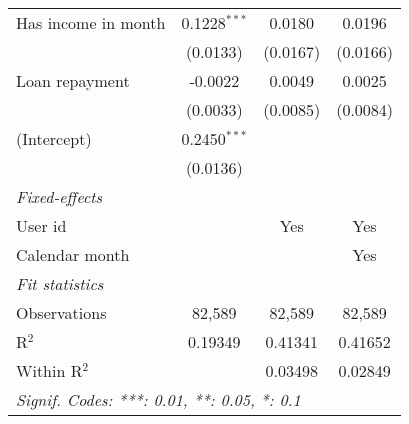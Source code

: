 \begin{table}[htbp]
\begin{footnotesize}
\begin{tabular}{lccc}
         Has income in month         & 0.1228$^{***}$  & 0.0180          & 0.0196\\
                                     & (0.0133)        & (0.0167)        & (0.0166)\\
         Loan repayment              & -0.0022         & 0.0049          & 0.0025\\
                                     & (0.0033)        & (0.0085)        & (0.0084)\\
         (Intercept)                 & 0.2450$^{***}$  &                 &   \\
                                     & (0.0136)        &                 &   \\
         \midrule \emph{Fixed-effects} &   &   &  \\
         User id                     &                 & Yes             & Yes\\
         Calendar month              &                 &                 & Yes\\
         \midrule \emph{Fit statistics} &   &   &  \\
         Observations                & 82,589          & 82,589          & 82,589\\
         R$^2$                       & 0.19349         & 0.41341         & 0.41652\\
         Within R$^2$                &                 & 0.03498         & 0.02849\\
         \midrule\midrule\multicolumn{4}{l}{\emph{Signif. Codes: ***: 0.01, **: 0.05, *: 0.1}}\\
      \end{tabular}
   \end{footnotesize}
\end{table}



